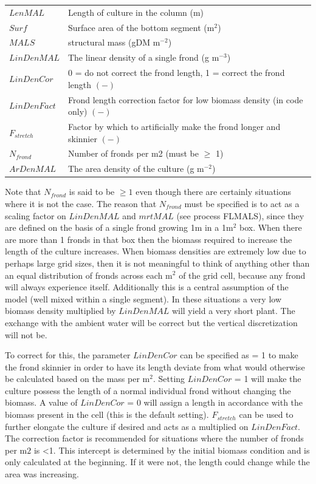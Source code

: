 \documentclass{deltares_manual}
\begin{document}
\begin{tabular}{ll}
$LenMAL$ & Length of culture in the column (m)\\
$Surf$ & Surface area of the bottom segment (m$^{2}$)\\
$MALS$ & structural mass (gDM m$^{-2}$)\\
$LinDenMAL$ & The linear density of a single frond (g m$^{-3}$)\\
$LinDenCor$ & 0 = do not correct the frond length, 1 = correct the frond length $(-)$\\
$LinDenFact$ & Frond length correction factor for low biomass density (in code only) $(-)$\\
$F_{stretch}$ & Factor by which to artificially make the frond longer and skinnier $(-)$\\
$N_{frond}$ & Number of fronds per m2 (must be $\ge$ 1)\\
$ArDenMAL$ & The area density of the culture (g m$^{-2}$)\\
\end{tabular}

Note that $N_{frond}$ is said to be $\ge 1$ even though there are certainly situations where it is not the case. The reason that $N_{frond}$ must be specified is to act as a scaling factor on $LinDenMAL$ and $mrtMAL$ (see process FLMALS), since they are defined on the basis of a single frond growing 1m in a 1m$^{2}$ box. When there are more than 1 fronds in that box then the biomass required to increase the length of the culture increases. When biomass densities are extremely low due to perhaps large grid sizes, then it is not meaningful to think of anything other than an equal distribution of fronds across each m$^{2}$ of the grid cell, because any frond will always experience itself. Additionally this is a central assumption of the model (well mixed within a single segment). In these situations a very low biomass density multiplied by $LinDenMAL$ will yield a very short plant. The exchange with the ambient water will be correct but the vertical discretization will not be. 

To correct for this, the parameter $LinDenCor$ can be specified as = 1 to make the frond skinnier in order to have its length deviate from what would otherwise be calculated based on the mass per m$^2$. Setting $LinDenCor$ = 1 will make the culture possess the length of a normal individual frond without changing the biomass. A value of $LinDenCor$ = 0 will assign a length in accordance with the biomass present in the cell (this is the default setting). $F_{stretch}$ can be used to further elongate the culture if desired and acts as a multiplied on $LinDenFact$. The correction factor is recommended for situations where the number of fronds per m${2}$ is \textless 1. This intercept is determined by the initial biomass condition and is only calculated at the beginning. If it were not, the length could change while the area was increasing.
\end{document}
